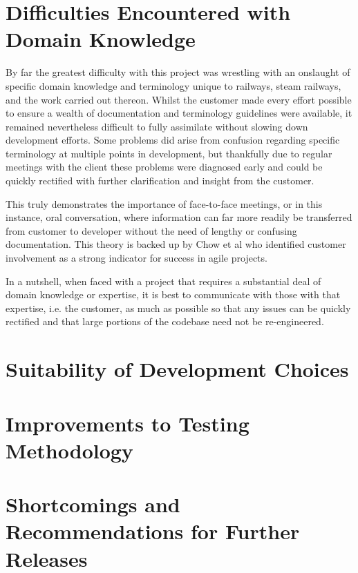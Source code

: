 \section{Difficulties Encountered with Domain Knowledge}
By far the greatest difficulty with this project was wrestling with an onslaught of specific domain knowledge and terminology unique to railways, steam railways, and the work carried out thereon. Whilst the customer made every effort possible to ensure a wealth of documentation and terminology guidelines were available, it remained nevertheless difficult to fully assimilate without slowing down development efforts. Some problems did arise from confusion regarding specific terminology at multiple points in development, but thankfully due to regular meetings with the client these problems were diagnosed early and could be quickly rectified with further clarification and insight from the customer. 

This truly demonstrates the importance of face-to-face meetings, or in this instance, oral conversation, where information can far more readily be transferred from customer to developer without the need of lengthy or confusing documentation. This theory is backed up by Chow et al who identified customer involvement as a strong indicator for success in agile projects. \cite{CHOW2008961}

In a nutshell, when faced with a project that requires a substantial deal of domain knowledge or expertise, it is best to communicate with those with that expertise, i.e. the customer, as much as possible so that any issues can be quickly rectified and that large portions of the codebase need not be re-engineered.

\section{Suitability of Development Choices}


\section{Improvements to Testing Methodology}

\section{Shortcomings and Recommendations for Further Releases}